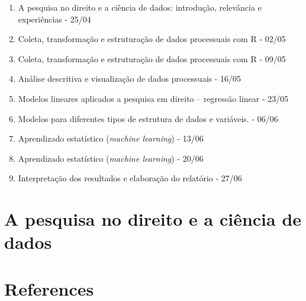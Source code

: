\documentclass[
  letterpaper,
  DIV=11,
  numbers=noendperiod]{scrreprt}
\newlength{\cslhangindent}
\newlength{\cslentryspacingunit} %
\newenvironment{CSLReferences}[2] %
 {%
  \setlength{\parindent}{0pt}
  \ifodd #1
  \let\oldpar\par
  \def\par{\hangindent=\cslhangindent\oldpar}
  \fi
  \setlength{\parskip}{#2\cslentryspacingunit}
 }%
 {}
\begin{document}
\begin{enumerate}
\def\labelenumi{\arabic{enumi}.}
\item
  A pesquisa no direito e a ciência de dados: introdução, relevância e
  experiências - 25/04
\item
  Coleta, transformação e estruturação de dados processuais com R -
  02/05
\item
  Coleta, transformação e estruturação de dados processuais com R -
  09/05
\item
  Análise descritiva e visualização de dados processuais - 16/05
\item
  Modelos lineares aplicados a pesquisa em direito -- regressão linear -
  23/05
\item
  Modelos para diferentes tipos de estrutura de dados e variáveis. -
  06/06
\item
  Aprendizado estatístico (\emph{machine learning}) - 13/06
\item
  Aprendizado estatístico (\emph{machine learning}) - 20/06
\item
  Interpretação dos resultados e elaboração do relatório - 27/06
\end{enumerate}


\hypertarget{a-pesquisa-no-direito-e-a-ciuxeancia-de-dados}{%
\chapter{A pesquisa no direito e a ciência de
dados}\label{a-pesquisa-no-direito-e-a-ciuxeancia-de-dados}}


\hypertarget{section}{%
\chapter{}\label{section}}


\hypertarget{references}{%
\chapter*{References}\label{references}}


\hypertarget{refs}{}
\begin{CSLReferences}{0}{0}
\end{CSLReferences}
\end{document}
